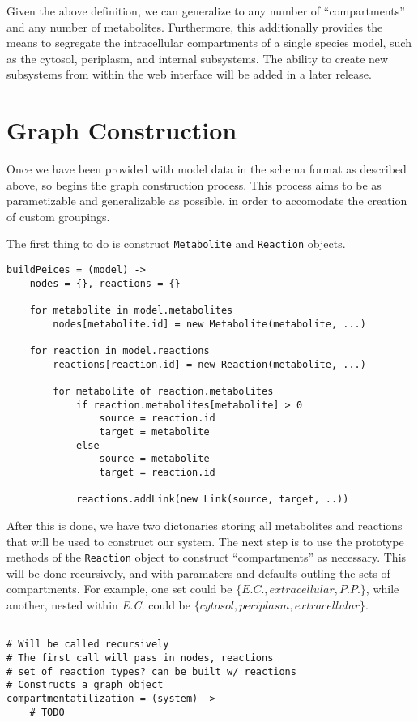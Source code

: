 Given the above definition, we can generalize to any number of ``compartments''
and any number of metabolites. Furthermore, this additionally provides the means
to segregate the intracellular compartments of a single species model, such as
the cytosol, periplasm, and internal subsystems. The ability to create new
subsystems from within the web interface will be added in a later release.

\section{Graph Construction}

Once we have been provided with model data in the schema format as described
above, so begins the graph construction process. This process aims to be
as parametizable and generalizable as possible, in order to accomodate
the creation of custom groupings.

The first thing to do is construct \texttt{Metabolite} and \texttt{Reaction}
objects.

\begin{verbatim}
buildPeices = (model) ->
    nodes = {}, reactions = {}

    for metabolite in model.metabolites
        nodes[metabolite.id] = new Metabolite(metabolite, ...)

    for reaction in model.reactions
        reactions[reaction.id] = new Reaction(metabolite, ...)

        for metabolite of reaction.metabolites
            if reaction.metabolites[metabolite] > 0
                source = reaction.id
                target = metabolite
            else
                source = metabolite
                target = reaction.id

            reactions.addLink(new Link(source, target, ..))
\end{verbatim}

After this is done, we have two dictonaries storing all metabolites and
reactions that will be used to construct our system. The next step is to use the
prototype methods of the \texttt{Reaction} object to construct ``compartments''
as necessary. This will be done recursively, and with paramaters and defaults
outling the sets of compartments. For example, one set could be $\{E.C.,
extracellular, P.P.\}$, while another, nested within \textit{E.C.} could be
$\{cytosol, periplasm, extracellular\}$.

\begin{verbatim}

# Will be called recursively
# The first call will pass in nodes, reactions
# set of reaction types? can be built w/ reactions
# Constructs a graph object
compartmentatilization = (system) ->
    # TODO

\end{verbatim}


